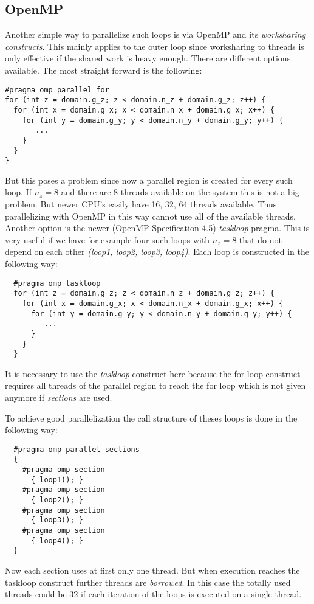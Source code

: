 \documentclass[master.tex]{subfiles}
\begin{document}
\subsection{OpenMP} \label{sec:open-mp-method}
Another simple way to parallelize such loops is via OpenMP and its \textit{worksharing constructs}. This mainly applies to the outer loop since worksharing to threads is only effective if the shared work is heavy enough. There are different options available. The most straight forward is the following:
\begin{lstlisting}
#pragma omp parallel for
for (int z = domain.g_z; z < domain.n_z + domain.g_z; z++) {
  for (int x = domain.g_x; x < domain.n_x + domain.g_x; x++) {
    for (int y = domain.g_y; y < domain.n_y + domain.g_y; y++) {
       ...
    }
  }
}
\end{lstlisting}
But this poses a problem since now a parallel region is created for every such loop. If $n_z=8$ and there are 8 threads available on the system this is not a big problem. But newer CPU's easily have 16, 32, 64 threads available. Thus parallelizing with OpenMP in this way cannot use all of the available threads. Another option is the newer (OpenMP Specification 4.5) \textit{taskloop} pragma. This is very useful if we have for example four such loops with $n_z=8$ that do not depend on each other \textit{(loop1, loop2, loop3, loop4)}. Each loop is constructed in the following way:
\begin{lstlisting}
  #pragma omp taskloop
  for (int z = domain.g_z; z < domain.n_z + domain.g_z; z++) {
    for (int x = domain.g_x; x < domain.n_x + domain.g_x; x++) {
      for (int y = domain.g_y; y < domain.n_y + domain.g_y; y++) {
         ...
      }
    }
  }
\end{lstlisting}
\begin{blockquote}
  \small
  It is necessary to use the \textit{taskloop} construct here because the for loop construct requires all threads of the parallel region to reach the for loop which is not given anymore if \textit{sections} are used.
\end{blockquote}

To achieve good parallelization the call structure of theses loops is done in the following way:
\begin{lstlisting}
  #pragma omp parallel sections
  {
    #pragma omp section 
      { loop1(); }
    #pragma omp section
      { loop2(); }
    #pragma omp section
      { loop3(); }
    #pragma omp section
      { loop4(); }
  }
\end{lstlisting}
Now each section uses at first only one thread. But when execution reaches the taskloop construct further threads are \textit{borrowed}. In this case the totally used threads could be 32 if each iteration of the loops is executed on a single thread.\newline
\end{document}
